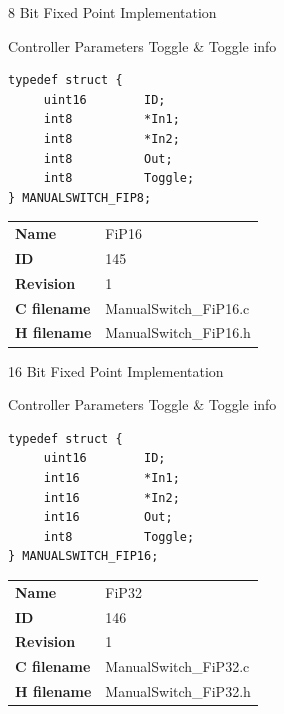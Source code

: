 8 Bit Fixed Point Implementation

\begin{XtoCtabular}{Controller Parameters}
Toggle & Toggle info\tabularnewline
\hline
\end{XtoCtabular}

\begin{lstlisting}
typedef struct {
     uint16        ID;
     int8          *In1;
     int8          *In2;
     int8          Out;
     int8          Toggle;
} MANUALSWITCH_FIP8;
\end{lstlisting}

\ifdefined \AddTestReports
{}
\fi
{}
\nopagebreak[0]
\begin{tabular}{l l}
\textbf{Name} & FiP16 \tabularnewline
\textbf{ID} & 145 \tabularnewline
\textbf{Revision} & 1 \tabularnewline
\textbf{C filename} & ManualSwitch\_FiP16.c \tabularnewline
\textbf{H filename} & ManualSwitch\_FiP16.h \tabularnewline
\end{tabular}
\vspace{1ex}

16 Bit Fixed Point Implementation

\begin{XtoCtabular}{Controller Parameters}
Toggle & Toggle info\tabularnewline
\hline
\end{XtoCtabular}

\begin{lstlisting}
typedef struct {
     uint16        ID;
     int16         *In1;
     int16         *In2;
     int16         Out;
     int8          Toggle;
} MANUALSWITCH_FIP16;
\end{lstlisting}

\ifdefined \AddTestReports
{}
\fi
{}
\nopagebreak[0]
\begin{tabular}{l l}
\textbf{Name} & FiP32 \tabularnewline
\textbf{ID} & 146 \tabularnewline
\textbf{Revision} & 1 \tabularnewline
\textbf{C filename} & ManualSwitch\_FiP32.c \tabularnewline
\textbf{H filename} & ManualSwitch\_FiP32.h \tabularnewline
\end{tabular}
\vspace{1ex}

